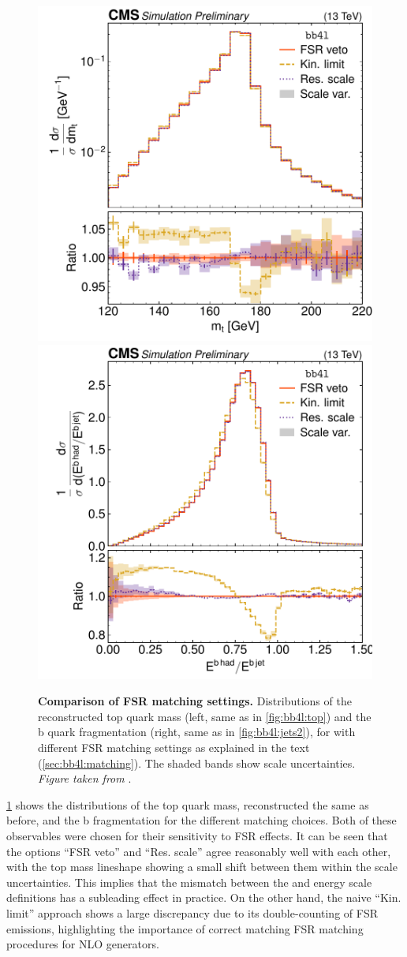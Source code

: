 \begin{figure}[tp]
    \centering
    \includegraphics[width=0.49 \textwidth]{figures/bb4l/matching/ADDED_top_mass.pdf}
    \hfill
    \includegraphics[width=0.49 \textwidth]{figures/bb4l/matching/MC_HFJETS_efracB.pdf}
    \caption{\textbf{Comparison of FSR matching settings.} Distributions of the reconstructed top quark mass (left, same as in \cref{fig:bb4l:top}) and the b quark fragmentation (right, same as in \cref{fig:bb4l:jets2}), for \bbfourl with different FSR matching settings as explained in the text (\cref{sec:bb4l:matching}). The shaded bands show scale uncertainties. \textit{Figure taken from }.}
    \label{fig:bb4l:matching}
\end{figure}

\cref{fig:bb4l:matching} shows the distributions of the top quark mass, reconstructed the same as before, and the b fragmentation for the different matching choices. Both of these observables were chosen for their sensitivity to FSR effects. It can be seen that the options ``FSR veto'' and ``Res. scale'' agree reasonably well with each other, with the top mass lineshape showing a small shift between them within the scale uncertainties. This implies that the mismatch between the \powheg and \pythia energy scale definitions has a subleading effect in practice. On the other hand, the naive ``Kin. limit'' approach shows a large discrepancy due to its double-counting of FSR emissions, highlighting the importance of correct matching FSR matching procedures for NLO generators.


